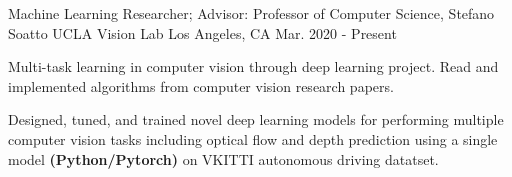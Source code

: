 \cventry
    {Machine Learning Researcher; Advisor: Professor of Computer Science, Stefano Soatto} %
    {UCLA Vision Lab} %
    {Los Angeles, CA} %
    {Mar. 2020 - Present} %
    {
      \begin{cvitems} %
        \item {Multi-task learning in computer vision through deep learning project. 
            Read and implemented algorithms from computer vision research papers. 
        }
        \item {  
        Designed, tuned, and trained novel deep learning models for performing 
        multiple computer vision tasks including optical flow and depth prediction
        using a single model \textbf{(Python/Pytorch)} on VKITTI autonomous driving 
        datatset.
        }
      \end{cvitems}
    } 